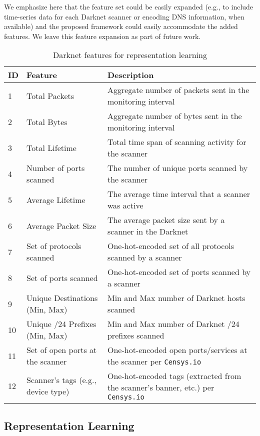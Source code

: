 \documentclass[manuscript, nonacm]{acmart}
\begin{document}
We emphasize here that the feature set could be easily expanded (e.g., to include time-series
data for each Darknet scanner or encoding DNS information, when available) and the proposed
framework could easily accommodate the added features. We leave this feature expansion
as part of future work.

\begin{table*}[ht]
\centering
 \caption{Darknet features for representation learning}
 \small
 \label{tab:all_features}
\begin{tabular}{p{0.1in}|p{1in}|p{3.5in}}
\hline
ID &
  Feature &
  Description \\ 
\hline
1 &
  Total Packets   &
  Aggregate number of packets sent in the monitoring interval \\
2 &
  Total Bytes  &
  Aggregate number of bytes sent in the monitoring interval \\
3 &
  Total Lifetime   &
  Total time span of scanning activity for the scanner \\
4 &
  Number of ports scanned &
  The number of unique ports scanned by the scanner \\
5 &
  Average Lifetime &
  The average time interval that a scanner was active \\
6 &
  Average Packet Size &
  The average packet size sent by a scanner in the Darknet \\
7 &
  Set of protocols scanned  &
  One-hot-encoded set of all protocols scanned by a scanner  \\
8 &
  Set of ports scanned  &
  One-hot-encoded set of ports scanned by a scanner  \\
9 &
  Unique Destinations (Min, Max)   &
  Min and Max number of Darknet hosts scanned \\
10 &
  Unique /24 Prefixes (Min, Max)   &
  Min and Max number of Darknet /24 prefixes scanned \\
11 &
  Set of open ports at the scanner  &
  One-hot-encoded open ports/services at the scanner per \texttt{Censys.io}    \\
12 &
  Scanner's tags (e.g., device type)   &
  One-hot-encoded tags (extracted from the scanner's banner, etc.) per \texttt{Censys.io}  \\
\hline
\end{tabular}
\end{table*}


\subsection{Representation Learning}
\label{sec:deepCl}
\end{document}

